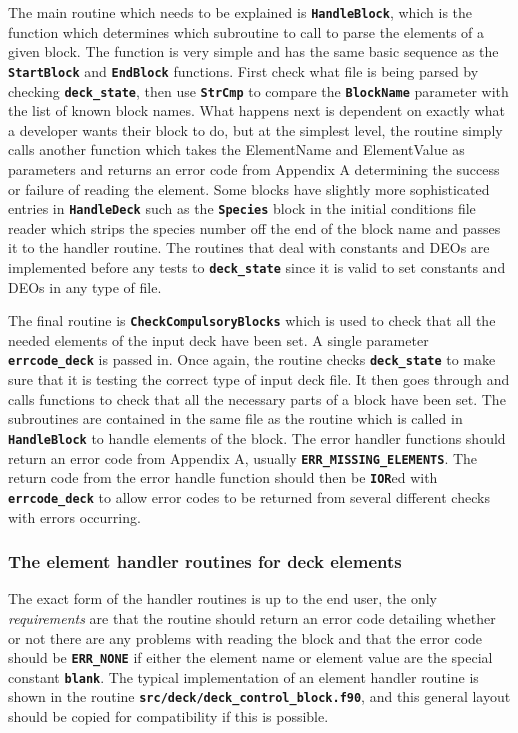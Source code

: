 \documentclass[12pt,a4paper]{article}
\newcommand{\inlinecode}[1]{{\color{warwickred} \bf\texttt{#1}}}
\begin{document}
The main routine which needs to be explained is \inlinecode{HandleBlock}, which
is the function which determines which subroutine to call to parse the elements
of a given block. The function is very simple and has the same basic sequence
as the \inlinecode{StartBlock} and \inlinecode{EndBlock} functions. First check
what file is being parsed by checking \inlinecode{deck\_state}, then use
\inlinecode{StrCmp} to compare the \inlinecode{BlockName} parameter with the
list of known block names. What happens next is dependent on exactly what a
developer wants their block to do, but at the simplest level, the routine
simply calls another function which takes the ElementName and ElementValue as
parameters and returns an error code from Appendix A determining the success or
failure of reading the element. Some blocks have slightly more sophisticated
entries in \inlinecode{HandleDeck} such as the \inlinecode{Species} block in
the initial conditions file reader which strips the species number off the end
of the block name and passes it to the handler routine. The routines that deal
with constants and DEOs are implemented before any tests to
\inlinecode{deck\_state} since it is valid to set constants and DEOs in any
type of file.

The final routine is \inlinecode{CheckCompulsoryBlocks} which is used to check
that all the needed elements of the input deck have been set. A single
parameter \inlinecode{errcode\_deck} is passed in. Once again, the routine
checks \inlinecode{deck\_state} to make sure that it is testing the correct
type of input deck file. It then goes through and calls functions to check that
all the necessary parts of a block have been set. The subroutines are contained
in the same file as the routine which is called in \inlinecode{HandleBlock} to
handle elements of the block. The error handler functions should return an
error code from Appendix A, usually \inlinecode{ERR\_MISSING\_ELEMENTS}. The
return code from the error handle function should then be \inlinecode{IOR}ed
with \inlinecode{errcode\_deck} to allow error codes to be returned from
several different checks with errors occurring.

\subsubsection{The element handler routines for deck elements}
The exact form of the handler routines is up to the end user, the only {\it
requirements} are that the routine should return an error code detailing
whether or not there are any problems with reading the block and that the error
code should be \inlinecode{ERR\_NONE} if either the element name or element
value are the special constant \inlinecode{blank}. The typical implementation
of an element handler routine is shown in the routine
\inlinecode{src/deck/deck\_control\_block.f90}, and this general layout should
be copied for compatibility if this is possible.\\
\end{document}
